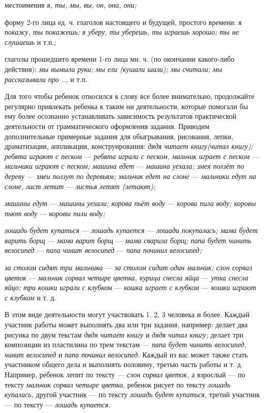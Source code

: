 \documentclass{book}
\renewcommand{\emph}[1]{\textit{#1}}
\begin{document}
местоимения \emph{я, ты, мы, вы, он, она, они;}

форму 2-го лица ед. ч. глаголов настоящего и будущей, простого времени:
я \emph{покажу, ты покажешь; я уберу, ты уберешь, ты играешь хорошо; ты
не слушаешь} и т.п.;

глаголы прошедшего времени 1-го лица мн. ч. (по окончании какого-либо
действия): \emph{мы вымыли руки; мы ели (кушали шали); мы считали; мы
рассказывали про ...} и т.п.

Для того чтобы ребенок относился к слову все более внимательно,
продолжайте регулярно привлекать ребенка к таким ни деятельности,
которые помогали бы ему более осознанно устанавливать зависимость
результатов практической деятельности от грамматического оформления
задания. Приводим дополнительные примерные задания для обыгрывания,
рисования, лепки, драматизации, аппликации, конструирования: \emph{дядя
читает книгу(читал книгу); ребята играют с песком} --- \emph{ребята
играли с песком,} \emph{мальчик играет с песком} --- \emph{мальчики
играют с песком; машина едет} --- \emph{машина уехала; змея ползёт по
дереву} --- \emph{змеи ползут по деревьям; мальчик едет на слоне} ---
\emph{мальчики едут на слоне, лист летит} --- \emph{листья летят
(летают);}

\emph{машины едут} --- \emph{машины уехали; корова пьёт воду} ---
\emph{корова пила воду; коровы пьют воду} --- \emph{коровы пили воду;}

\emph{лошадь будет купаться} --- \emph{лошадь купается} --- \emph{лошади
покупалась; мама будет варить борщ} --- \emph{мама варит борщ} ---
\emph{мама сварила борщ; папа будет чинить велосипед} --- \emph{папа
чинит велосипед} --- \emph{папа починил велосипед;}

\emph{за столом сидят три мальчика} --- \emph{за столом сидит один
мальчик; слон сорвал цветок} --- \emph{мальчик сорвал четыре цветка,
курица снесла яйца} --- \emph{утка снесла яйцо; три кошки играли}
\emph{с клубком} --- \emph{кошка играет с клубком} --- \emph{кошки
играют с клубком} и т. д.

В этом виде деятельности могут участвовать 1, 2, 3 человека и более.
Каждый участник работы может выполнять два или три задания, например:
делает два рисунка по двум текстам \emph{дядя читает книгу} и \emph{дядя
читал книгу;} делает три композиции из пластилина по трем текстам ---
\emph{папа будет чинить велосипед, чинит велосипед} и \emph{папа починил
велосипед.} Каждый из вас может также стать участником общего дела и
выполнять половину, третью часть работы и т. д. Например, ребенок лепит
по тексту --- \emph{слон сорвал цветок,} а взрослый --- по тексту
\emph{мальчик сорвал четыре цветка}, ребенок рисует по тексту
\emph{лошадь купалась,} другой участник --- по тексту \emph{лошадь будет
купаться,} третий участник --- по тексту --- \emph{лошадь купается.}
\end{document}
